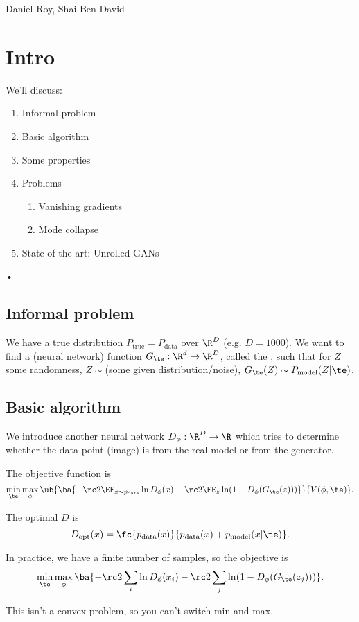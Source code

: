 Daniel Roy, Shai Ben-David

\section{Intro}

We'll discuss:
\begin{enumerate}
\item
Informal problem
\item
Basic algorithm
\item
Some properties
\item
Problems
\begin{enumerate}
\item
Vanishing gradients
\item
Mode collapse
\end{enumerate}
\item
State-of-the-art: Unrolled GANs
\end{enumerate}•

\subsection{Informal problem}
We have a true distribution $P_{\text{true}} = P_{\text{data}}$ over $\R^{D}$ (e.g. $D=1000$). We want to find a (neural network) function $G_\te:\R^d\to \R^D$, called the , such that for $Z$ some randomness, $Z\sim$(some given distribution/noise), $G_\te(Z) \sim P_{\text{model}}(Z|\te)$.

\subsection{Basic algorithm}

We introduce another neural network $D_\phi:\R^D\to \R$ which tries to determine whether the data point (image) is from the real model or from the generator.

The objective function is
$$
\min_\te \max_\phi
\ub{\ba{
-\rc 2\EE_{x\sim p_{\text{data}}} \ln D_\phi(x) - \rc 2 \EE_z \ln (1-D_\phi(G_\te(z)))}}{V(\phi,\te)}.
$$

The optimal $D$ is
$$
D_{\text{opt}}(x) = \fc{p_{\text{data}}(x)}{p_{\text{data}}(x) + p_{\text{model}}(x|\te)}.
$$

In practice, we have a finite number of samples, so the objective is 
$$
\min_\te \max_\phi
\ba{
-\rc 2\sum_i \ln D_\phi(x_i) - \rc 2 \sum_j \ln (1-D_\phi(G_\te(z_j)))}.
$$

This isn't a convex problem, so you can't switch min and max.


